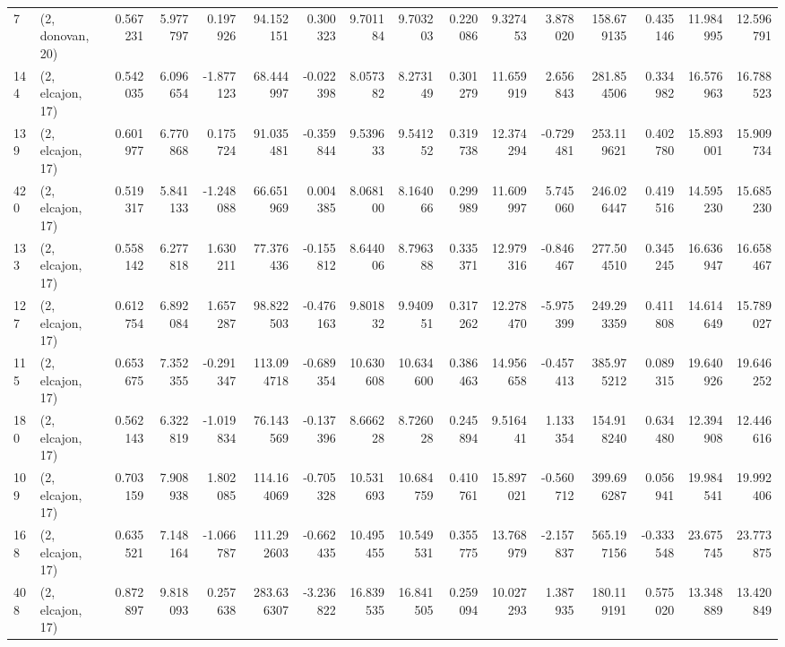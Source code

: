 \begin{tabular}{llrrrrrrrrrrrrrr}
7   &  (2, donovan, 20) &   0.567231 &   5.977797 &   0.197926 &    94.152151 &   0.300323 &   9.701184 &   9.703203 &  0.220086 &   9.327453 &   3.878020 &   158.679135 &  0.435146 &  11.984995 &  12.596791 \\
144 &  (2, elcajon, 17) &   0.542035 &   6.096654 &  -1.877123 &    68.444997 &  -0.022398 &   8.057382 &   8.273149 &  0.301279 &  11.659919 &   2.656843 &   281.854506 &  0.334982 &  16.576963 &  16.788523 \\
139 &  (2, elcajon, 17) &   0.601977 &   6.770868 &   0.175724 &    91.035481 &  -0.359844 &   9.539633 &   9.541252 &  0.319738 &  12.374294 &  -0.729481 &   253.119621 &  0.402780 &  15.893001 &  15.909734 \\
420 &  (2, elcajon, 17) &   0.519317 &   5.841133 &  -1.248088 &    66.651969 &   0.004385 &   8.068100 &   8.164066 &  0.299989 &  11.609997 &   5.745060 &   246.026447 &  0.419516 &  14.595230 &  15.685230 \\
133 &  (2, elcajon, 17) &   0.558142 &   6.277818 &   1.630211 &    77.376436 &  -0.155812 &   8.644006 &   8.796388 &  0.335371 &  12.979316 &  -0.846467 &   277.504510 &  0.345245 &  16.636947 &  16.658467 \\
127 &  (2, elcajon, 17) &   0.612754 &   6.892084 &   1.657287 &    98.822503 &  -0.476163 &   9.801832 &   9.940951 &  0.317262 &  12.278470 &  -5.975399 &   249.293359 &  0.411808 &  14.614649 &  15.789027 \\
115 &  (2, elcajon, 17) &   0.653675 &   7.352355 &  -0.291347 &   113.094718 &  -0.689354 &  10.630608 &  10.634600 &  0.386463 &  14.956658 &  -0.457413 &   385.975212 &  0.089315 &  19.640926 &  19.646252 \\
180 &  (2, elcajon, 17) &   0.562143 &   6.322819 &  -1.019834 &    76.143569 &  -0.137396 &   8.666228 &   8.726028 &  0.245894 &   9.516441 &   1.133354 &   154.918240 &  0.634480 &  12.394908 &  12.446616 \\
109 &  (2, elcajon, 17) &   0.703159 &   7.908938 &   1.802085 &   114.164069 &  -0.705328 &  10.531693 &  10.684759 &  0.410761 &  15.897021 &  -0.560712 &   399.696287 &  0.056941 &  19.984541 &  19.992406 \\
168 &  (2, elcajon, 17) &   0.635521 &   7.148164 &  -1.066787 &   111.292603 &  -0.662435 &  10.495455 &  10.549531 &  0.355775 &  13.768979 &  -2.157837 &   565.197156 & -0.333548 &  23.675745 &  23.773875 \\
408 &  (2, elcajon, 17) &   0.872897 &   9.818093 &   0.257638 &   283.636307 &  -3.236822 &  16.839535 &  16.841505 &  0.259094 &  10.027293 &   1.387935 &   180.119191 &  0.575020 &  13.348889 &  13.420849 \\

\end{tabular}
